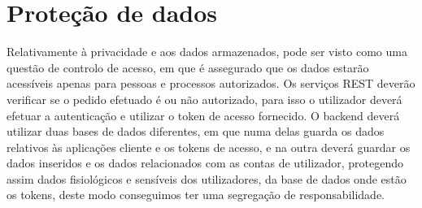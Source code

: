 \section{Proteção de dados}
\label{cap6:protecaodados}
Relativamente à privacidade e aos dados armazenados, pode ser visto como uma questão de controlo de acesso, em que é assegurado que os dados estarão acessíveis apenas para pessoas e processos autorizados. Os serviços \gls{REST} deverão verificar se o pedido efetuado é ou não autorizado, para isso o utilizador deverá efetuar a autenticação e utilizar o token de acesso fornecido. O backend deverá utilizar duas bases de dados diferentes, em que numa delas guarda os dados relativos às aplicações cliente e os tokens de acesso, e na outra deverá guardar os dados inseridos e os dados relacionados com as contas de utilizador, protegendo assim dados fisiológicos e sensíveis dos utilizadores, da base de dados onde estão os tokens, deste modo conseguimos ter uma segregação de responsabilidade.

\cleardoublepage